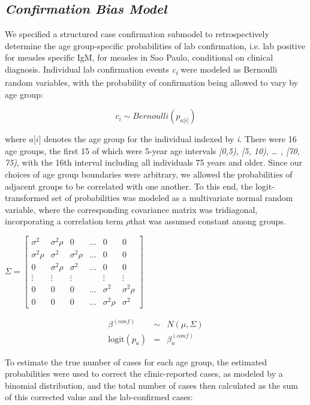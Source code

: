 \subsection{\texorpdfstring{\emph{Confirmation Bias
Model}}{Confirmation Bias Model}}\label{confirmation-bias-model}

We specified a structured case confirmation submodel to retrospectively
determine the age group-specific probabilities of lab confirmation, i.e.
lab positive for measles specific IgM, for measles in Sao Paulo,
conditional on clinical diagnosis. Individual lab confirmation events
\emph{c\textsubscript{i}} were modeled as Bernoulli random variables,
with the probability of confirmation being allowed to vary by age group:

\[c_{i} \sim Bernoulli(p_{a\lbrack i\rbrack})\]

where \(a\lbrack i\rbrack\) denotes the age group for the individual
indexed by \emph{i}. There were 16 age groups, the first 15 of which
were 5-year age intervals \emph{{[}0,5), {[}5, 10), \ldots{} , {[}70,
75)}, with the 16th interval including all individuals 75 years and
older. Since our choices of age group boundaries were arbitrary, we
allowed the probabilities of adjacent groups to be correlated with one
another. To this end, the logit-transformed set of probabilities was
modeled as a multivariate normal random variable, where the
corresponding covariance matrix was tridiagonal, incorporating a
correlation term \(\rho\)that was assumed constant among groups.

\(
\Sigma = \left[{
\begin{array}{c}
  {\sigma^2} & {\sigma^2 \rho} & 0& \ldots & {0} & {0}  \\
  {\sigma^2 \rho} & {\sigma^2} &  \sigma^2 \rho & \ldots & {0}  & {0} \\
  {0} & \sigma^2 \rho & {\sigma^2} & \ldots & {0} & {0} \\
  \vdots & \vdots & \vdots &  & \vdots & \vdots\\
  {0} & {0} & 0 & \ldots &  {\sigma^2} & \sigma^2 \rho  \\
{0} & {0} & 0 & \ldots & \sigma^2 \rho &  {\sigma^2} 
\end{array}
}\right]\)

\begin{eqnarray}
\beta^{(conf)} &\sim& N(\mu, \Sigma) \\
\text{logit}(p_a) &=& \beta_a^{(conf)}
\end{eqnarray}

To estimate the true number of cases for each age group, the estimated probabilities were used to correct the clinic-reported cases, as modeled by a binomial distribution, and the total number of cases then calculated as the sum of this corrected value and the lab-confirmed cases:

